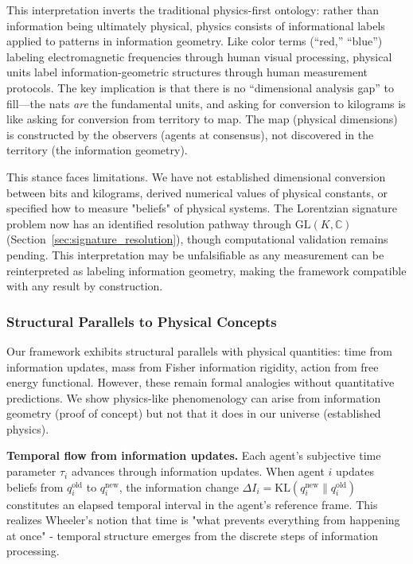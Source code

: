 \documentclass[11pt]{article}
\begin{document}
This interpretation inverts the traditional physics-first ontology: rather than information being ultimately physical, physics consists of informational labels applied to patterns in information geometry. Like color terms (``red,'' ``blue'') labeling electromagnetic frequencies through human visual processing, physical units label information-geometric structures through human measurement protocols. The key implication is that there is no ``dimensional analysis gap'' to fill---the nats \emph{are} the fundamental units, and asking for conversion to kilograms is like asking for conversion from territory to map. The map (physical dimensions) is constructed by the observers (agents at consensus), not discovered in the territory (the information geometry).

This stance faces limitations. We have not established dimensional conversion between bits and kilograms, derived numerical values of physical constants, or specified how to measure "beliefs" of physical systems. The Lorentzian signature problem now has an identified resolution pathway through $\mathrm{GL}(K, \mathbb{C})$ (Section~\ref{sec:signature_resolution}), though computational validation remains pending. This interpretation may be unfalsifiable as any measurement can be reinterpreted as labeling information geometry, making the framework compatible with any result by construction.

\subsubsection{Structural Parallels to Physical Concepts}

Our framework exhibits structural parallels with physical quantities: time from information updates, mass from Fisher information rigidity, action from free energy functional. However, these remain formal analogies without quantitative predictions. We show physics-like phenomenology can arise from information geometry (proof of concept) but not that it does in our universe (established physics).

\textbf{Temporal flow from information updates.} Each agent's subjective time parameter $\tau_i$ advances through information updates. When agent $i$ updates beliefs from $q_i^{\text{old}}$ to $q_i^{\text{new}}$, the information change $\Delta I_i = \mathrm{KL}(q_i^{\text{new}} \| q_i^{\text{old}})$ constitutes an elapsed temporal interval in the agent's reference frame. This realizes Wheeler's notion that time is "what prevents everything from happening at once" - temporal structure emerges from the discrete steps of information processing.
\end{document}
